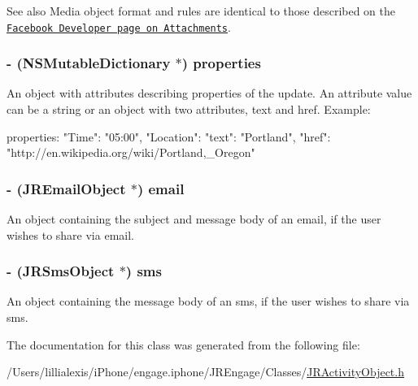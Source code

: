 \begin{DoxySeeAlso}{See also}
Media object format and rules are identical to those described on the \href{http://developers.facebook.com/docs/guides/attachments}{\tt Facebook Developer page on Attachments}. 
\end{DoxySeeAlso}
\hypertarget{interface_j_r_activity_object_a1acf84854d275510685a1f2066061c4e}{
\subsubsection[{properties}]{\setlength{\rightskip}{0pt plus 5cm}-\/ (NSMutableDictionary $\ast$) properties}}
\label{interface_j_r_activity_object_a1acf84854d275510685a1f2066061c4e}
An object with attributes describing properties of the update. An attribute value can be a string or an object with two attributes, text and href. Example: 
\begin{DoxyCode}
   properties: 
   {
       "Time": "05:00",
       "Location": 
       {
           "text": "Portland",
           "href": "http://en.wikipedia.org/wiki/Portland,_Oregon"
       }
   }
\end{DoxyCode}
 \hypertarget{interface_j_r_activity_object_aa26818070a5987c70ef14700d6f6c72c}{
\subsubsection[{email}]{\setlength{\rightskip}{0pt plus 5cm}-\/ ({\bf JREmailObject} $\ast$) email}}
\label{interface_j_r_activity_object_aa26818070a5987c70ef14700d6f6c72c}
An object containing the subject and message body of an email, if the user wishes to share via email. \hypertarget{interface_j_r_activity_object_a7719b59135bd02dbd03d4b35b17cb0a0}{
\subsubsection[{sms}]{\setlength{\rightskip}{0pt plus 5cm}-\/ ({\bf JRSmsObject} $\ast$) sms}}
\label{interface_j_r_activity_object_a7719b59135bd02dbd03d4b35b17cb0a0}
An object containing the message body of an sms, if the user wishes to share via sms. 

The documentation for this class was generated from the following file:\begin{DoxyCompactItemize}
\item 
/Users/lillialexis/iPhone/engage.iphone/JREngage/Classes/\hyperlink{_j_r_activity_object_8h}{JRActivityObject.h}\end{DoxyCompactItemize}
